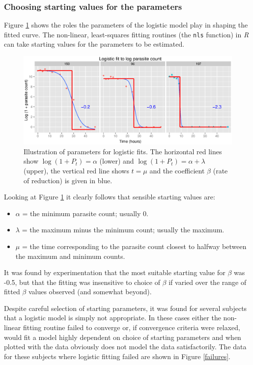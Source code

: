 \subsubsection*{Choosing starting values for the parameters}
Figure \ref{logparms} shows the roles the parameters of the logistic model play in shaping the fitted curve. The non-linear, least-squares fitting routines (the \texttt{nls} function) in \emph{R} can take starting values for the parameters to be estimated.
\begin{figure}[h]
\includegraphics[width=6.1in]{logparms.eps} 
\caption{Illustration of parameters for logistic fits.\newline
The horizontal red lines show $\log(1+P_t)=\alpha$ (lower) and $\log(1+P_t)=\alpha+\lambda$ (upper), the vertical red line shows $t=\mu$ and the coefficient $\beta$ (rate of reduction) is given in blue.}\label{logparms}
\end{figure}

Looking at Figure \ref{logparms} it clearly follows that sensible starting values are:
\begin{itemize}
\item $\alpha$ = the minimum parasite count; usually 0.
\item $\lambda$ = the maximum minus the minimum count; usually the maximum.
\item $\mu$ = the time corresponding to the parasite count closest to halfway between the maximum and minimum counts.
\end{itemize} 
It was found by experimentation that the most suitable starting value for $\beta$ was -0.5, but that the fitting was insensitive to choice of $\beta$ if varied over the range of fitted $\beta$ values observed (and somewhat beyond).

Despite careful selection of starting parameters, it was found for several subjects that a logistic model is simply not appropriate. In these cases either the non-linear fitting routine failed to converge or, if convergence criteria were relaxed, would fit a model highly dependent on choice of starting parameters and when plotted with the data obviously does not model the data satisfactorily. The data for these subjects where logistic fitting failed are shown in Figure \ref{failures}.

